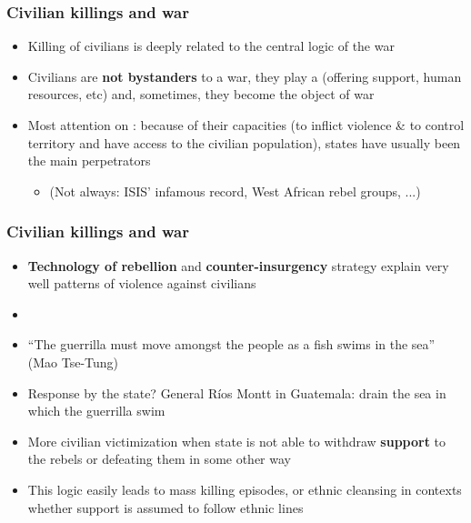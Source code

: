 \documentclass[aspectratio=43]{beamer}
\begin{document}
\begin{frame}
\frametitle{Civilian killings and war}
\centering

\begin{itemize}
  \item<1-> Killing of civilians is deeply related to the central logic of the war
  \item<2-> Civilians are \textbf{not bystanders} to a war, they play a  (offering support, human resources, etc) and, sometimes, they become the object of war
  \item<3-> Most attention on : because of their capacities (to inflict violence \& to control territory and have access to the civilian population), states have usually been the main perpetrators
  \begin{itemize}
    \item[] (Not always: ISIS' infamous record, West African rebel groups, ...)
  \end{itemize}
\end{itemize}

\end{frame}

\begin{frame}
\frametitle{Civilian killings and war}
\centering

\begin{itemize}
  \item<1-> \textbf{Technology of rebellion} and \textbf{counter-insurgency} strategy explain very well patterns of violence against civilians
  \item[]
  \item<2-> ``The guerrilla must move amongst the people as a fish swims in the sea'' (Mao Tse-Tung)
  \item<2-> Response by the state? General Ríos Montt in Guatemala: drain the sea in which the guerrilla swim
  \item<3-> More civilian victimization when state is not able to withdraw \textbf{support} to the rebels or defeating them in some other way
  \item<3-> This logic easily leads to mass killing episodes, or ethnic cleansing in contexts whether support is assumed to follow ethnic lines
\end{itemize}

\end{frame}
\end{document}
